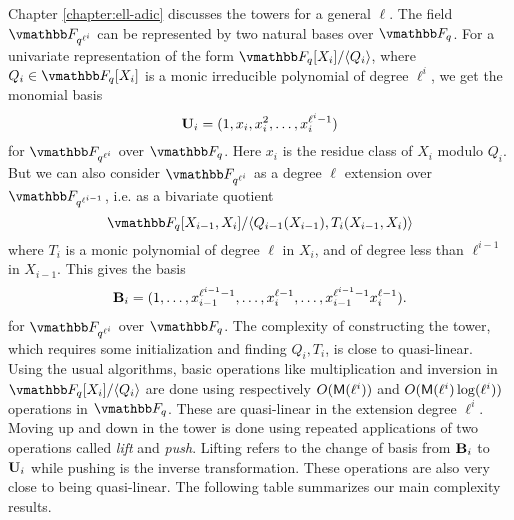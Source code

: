 Chapter \ref{chapter:ell-adic} discusses the towers for a general $\ell$. The field 
$\F_{q^{\ell^i}}$ can be represented by two natural bases over $\F_q$. For a univariate 
representation of the form $\F_q[X_i]/\ang{Q_i}$, where $Q_i \in \F_q[X_i]$ is a monic irreducible 
polynomial of degree $\ell^i$, we get the monomial basis
\[ \mathbf{U}_i = (1,x_{i},x_{i}^2,\ldots,x_{i}^{\ell^{i}-1}) \] 
for $\F_{q^{\ell^i}}$ over $\F_q$. Here $x_i$ is the residue class of $X_i$ modulo $Q_i$. But we 
can also consider $\F_{q^{\ell^i}}$ as a degree $\ell$ extension over $\F_{q^{\ell^{i - 1}}}$, 
i.e. as a bivariate quotient
\[ \F_q[X_{i-1},X_i]/\ang{Q_{i-1}(X_{i-1}), T_i(X_{i-1},X_i)} \]
where $T_i$ is a monic polynomial of degree $\ell$ in $X_i$, and of degree less than $\ell^{i-1}$ 
in $X_{i-1}$. This gives the basis
\[ \mathbf{B}_{i} = (1,\ldots,x_{i-1}^{\ell^{i-1}-1},\ldots,x_i^{\ell-1},\ldots, x_{i-1}^{\ell^{i-1}-1}
x_i^{\ell-1}). \]
for $\F_{q^{\ell^i}}$ over $\F_q$. The complexity of constructing the tower, which requires some 
initialization and finding $Q_i, T_i$, is close to quasi-linear. Using the usual algorithms, basic 
operations like multiplication and inversion in $\F_q[X_i]/\ang{Q_i}$ are done using respectively 
$O(\mathsf{M}(\ell^i))$ and $O(\mathsf{M}(\ell^i)\log(\ell^i))$ operations in $\F_q$. These are quasi-linear in 
the extension degree $\ell^i$. Moving up and down in the tower is done using repeated applications 
of two operations called \textit{lift} and \textit{push}. Lifting refers to the change of basis 
from $\mathbf{B}_i$ to $\mathbf{U}_i$ while pushing is the inverse transformation. These operations are also 
very close to being quasi-linear. The following table summarizes our main complexity results.

\vspace*{4mm}

